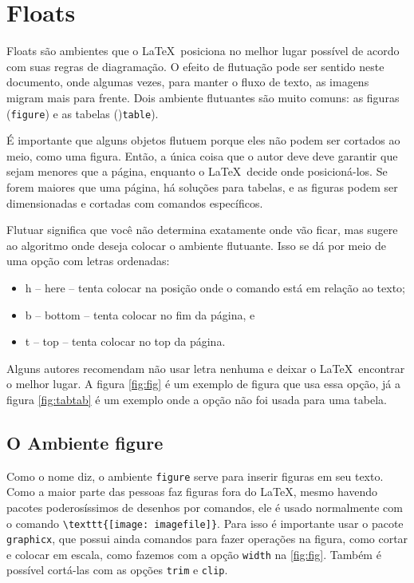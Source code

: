  

\section{Floats}

Floats são ambientes que o \LaTeX\ posiciona no melhor lugar possível de acordo com suas regras de diagramação. O efeito de flutuação pode ser sentido neste documento, onde algumas vezes, para manter o fluxo de texto, as imagens migram mais para frente. Dois ambiente flutuantes são muito comuns: as figuras (\lstinline|figure|) e as tabelas ()\lstinline|table|).

É importante que alguns objetos flutuem porque eles não podem ser cortados ao meio, como uma figura. Então, a única coisa que o autor deve deve garantir que sejam menores que a página, enquanto o \LaTeX\  decide onde posicioná-los. 
Se forem maiores que uma página, há soluções para tabelas, e as figuras podem ser dimensionadas e cortadas com comandos específicos.

Flutuar significa que você não determina exatamente onde vão ficar, mas sugere ao algoritmo onde deseja colocar o ambiente flutuante. Isso se dá por meio de uma opção com letras ordenadas: 
\begin{itemize}
    \item h -- here -- tenta colocar na posição onde o comando está em relação ao texto;
    \item     b -- bottom -- tenta colocar no fim da página, e
    \item t -- top -- tenta colocar no top da página.
\end{itemize}
Alguns autores recomendam não usar letra nenhuma e deixar o \LaTeX\    encontrar o melhor lugar. A figura \ref{fig:fig} é um exemplo de figura que usa essa opção, já a figura \ref{fig:tabtab} é um exemplo onde a opção não foi usada para uma tabela.

\subsection{O Ambiente figure}

Como o nome diz, o ambiente \lstinline|figure| serve para inserir figuras em seu texto. Como a maior parte das pessoas faz figuras fora do \LaTeX, mesmo havendo pacotes poderosíssimos de desenhos por comandos, ele é usado normalmente com o comando
\lstinline|\texttt{[image: imagefile]}|. Para isso é importante usar o pacote \lstinline|graphicx|\parencite{Carlisle:2017}, que possui ainda comandos para fazer operações na figura, como cortar e colocar em escala, como fazemos com a opção \lstinline|width| na \ref{fig:fig}. Também é possível cortá-las com as opções \lstinline|trim| e \lstinline|clip|.


